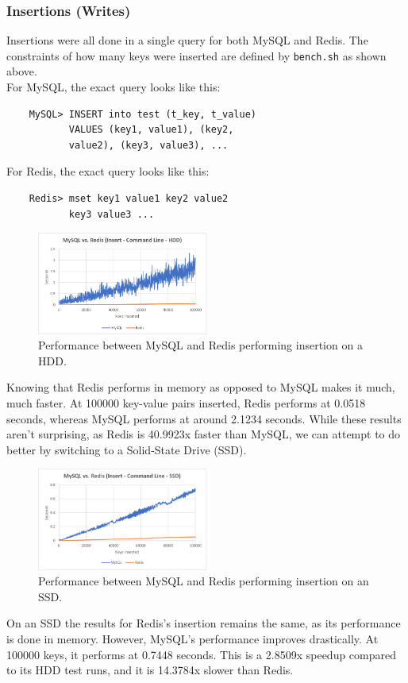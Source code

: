 \documentclass[letterpaper, 10 pt, conference]{ieeeconf}
\begin{document}
\subsubsection{Insertions (Writes)}
Insertions were all done in a single query for both MySQL and Redis. The constraints of how many keys were inserted are defined by \texttt{bench.sh} as shown above.\\
For MySQL, the exact query looks like this:
\begin{verbatim}
    MySQL> INSERT into test (t_key, t_value)
           VALUES (key1, value1), (key2,
           value2), (key3, value3), ...
\end{verbatim}
For Redis, the exact query looks like this:
\begin{verbatim}
    Redis> mset key1 value1 key2 value2
           key3 value3 ...
\end{verbatim}
\begin{figure}[h]
    \centering
    \includegraphics[width=0.5\textwidth]{1.png}
    \caption{Performance between MySQL and Redis performing insertion on a HDD.}
    \label{fig:mesh1}
\end{figure}
Knowing that Redis performs in memory as opposed to MySQL makes it much, much faster. At 100000 key-value pairs inserted, Redis performs at 0.0518 seconds, whereas MySQL performs at around 2.1234 seconds. While these results aren't surprising, as Redis is 40.9923x faster than MySQL, we can attempt to do better by switching to a Solid-State Drive (SSD).
\begin{figure}[h]
    \centering
    \includegraphics[width=0.5\textwidth]{2.png}
    \caption{Performance between MySQL and Redis performing insertion on an SSD.}
    \label{fig:mesh1}
\end{figure}
On an SSD the results for Redis's insertion remains the same, as its performance is done in memory. However, MySQL's performance improves drastically. At 100000 keys, it performs at 0.7448 seconds. This is a 2.8509x speedup compared to its HDD test runs, and it is 14.3784x slower than Redis.
\end{document}
